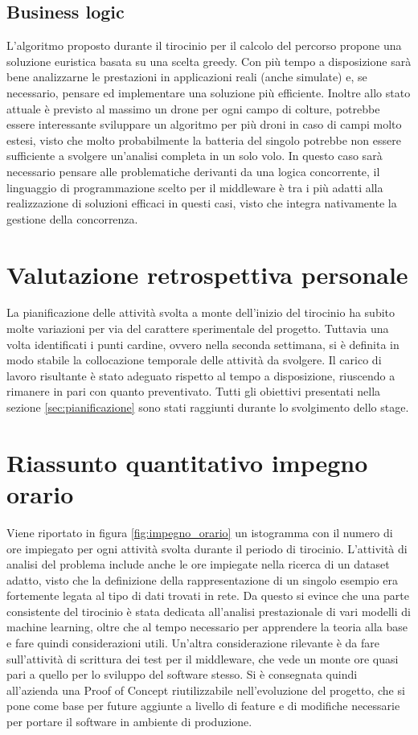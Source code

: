 \subsection{Business logic}
L'algoritmo proposto durante il tirocinio per il calcolo del percorso propone una soluzione euristica basata su una scelta greedy. Con più tempo a disposizione sarà bene analizzarne le prestazioni in applicazioni reali (anche simulate) e, se necessario, pensare ed implementare una soluzione più efficiente. Inoltre allo stato attuale è previsto al massimo un drone per ogni campo di colture, potrebbe essere interessante sviluppare un algoritmo per più droni in caso di campi molto estesi, visto che molto probabilmente la batteria del singolo potrebbe non essere sufficiente a svolgere un'analisi completa in un solo volo. In questo caso sarà necessario pensare alle problematiche derivanti da una logica concorrente, il linguaggio di programmazione scelto per il middleware è tra i più adatti alla realizzazione di soluzioni efficaci in questi casi, visto che integra nativamente la gestione della concorrenza.

\section{Valutazione retrospettiva personale}
La pianificazione delle attività svolta a monte dell'inizio del tirocinio ha subito molte variazioni per via del carattere sperimentale del progetto. Tuttavia una volta identificati i punti cardine, ovvero nella seconda settimana, si è definita in modo stabile la collocazione temporale delle attività da svolgere. Il carico di lavoro risultante è stato adeguato rispetto al tempo a disposizione, riuscendo a rimanere in pari con quanto preventivato. Tutti gli obiettivi presentati nella sezione \ref{sec:pianificazione} sono stati raggiunti durante lo svolgimento dello stage.

\section{Riassunto quantitativo impegno orario}
Viene riportato in figura \ref{fig:impegno_orario} un istogramma con il numero di ore impiegato per ogni attività svolta durante il periodo di tirocinio. L'attività di analisi del problema include anche le ore impiegate nella ricerca di un dataset adatto, visto che la definizione della rappresentazione di un singolo esempio era fortemente legata al tipo di dati trovati in rete. Da questo si evince che una parte consistente del tirocinio è stata dedicata all'analisi prestazionale di vari modelli di machine learning, oltre che al tempo necessario per apprendere la teoria alla base e fare quindi considerazioni utili.
Un'altra considerazione rilevante è da fare sull'attività di scrittura dei test per il middleware, che vede un monte ore quasi pari a quello per lo sviluppo del software stesso. Si è consegnata quindi all'azienda una Proof of Concept riutilizzabile nell'evoluzione del progetto, che si pone come base per future aggiunte a livello di feature e di modifiche necessarie per portare il software in ambiente di produzione.

